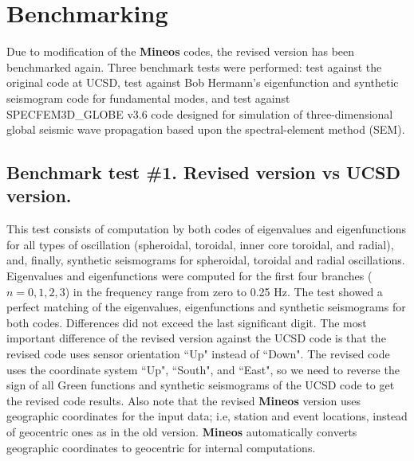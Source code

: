 \section{Benchmarking}

Due to modification of the {\bf Mineos} codes, the revised version has been
benchmarked again. Three benchmark tests were performed:
test against the original code at UCSD, test against Bob Hermann's
eigenfunction and synthetic seismogram code for fundamental modes, 
and test against SPECFEM3D\_GLOBE v3.6 code designed for
simulation of three-dimensional global seismic wave propagation
based upon the spectral-element method (SEM).

\subsection{Benchmark test \#1. Revised version vs UCSD version.}

This test consists of computation  by both codes of eigenvalues and 
eigenfunctions for all types of oscillation (spheroidal, toroidal, 
inner core toroidal, and radial), and, finally, synthetic seismograms for 
spheroidal, toroidal and radial oscillations.
Eigenvalues and eigenfunctions  were computed for the first four branches
($n=0,1,2,3$) in the frequency range from zero to 0.25 Hz. 
The test showed a perfect matching of the eigenvalues, eigenfunctions and 
synthetic seismograms for both codes. Differences did not exceed the last 
significant digit. The most important difference of the revised version against
the UCSD code is that the revised code uses sensor orientation ``Up" instead 
of ``Down". The revised code uses  the coordinate system ``Up", ``South", and
``East", so we need to reverse the sign of all Green functions and synthetic
seismograms of the UCSD code to get the revised code results.
Also note that the revised {\bf Mineos} version uses geographic coordinates 
for the input data; i.e, station and event locations, instead of geocentric 
ones as in the old version. {\bf Mineos} automatically converts geographic 
coordinates to geocentric for internal computations.

